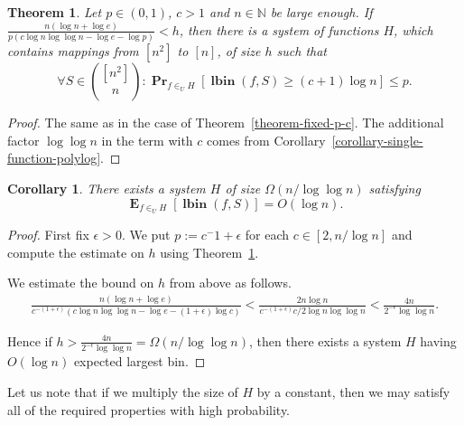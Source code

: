 \documentclass{article}
\newcommand{\lbin}[2]{\operatorname{\mathbf{lbin}}({#1}, {#2})}
\newcommand{\probs}[2]{\operatorname{\mathbf{Pr}}_{{#1}}\left[{#2}\right]}
\newcommand{\expects}[2]{\operatorname{\mathbf{E}}_{{#1}}\left[{#2}\right]}
\newtheorem{theorem}{Theorem}
\newtheorem{corollary}{Corollary}
\begin{document}
\begin{theorem}
\label{theorem-fixed-p-c-polylog}
Let $p \in (0, 1)$, $c > 1$ and $n \in \mathbb{N}$ be large enough. If $\frac{n(\log n + \log e)}{p(c \log n \log \log n - \log e - \log{p})} < h$, then there is a system of functions $H$, which contains mappings from $[n^2]$ to $[n]$, of size $h$ such that 
\[
\forall S \in \binom{[n^2]}{n} \colon \probs{f \in_U H}{\lbin{f}{S} \geq (c + 1) \log n} \leq p.
\]
\end{theorem}
\begin{proof}
The same as in the case of Theorem~\ref{theorem-fixed-p-c}. The additional factor $\log \log n$ in the term with $c$ comes from Corollary~\ref{corollary-single-function-polylog}.
\end{proof}

\begin{corollary}
There exists a system $H$ of size $\Omega(n/\log \log n)$ satisfying \[\expects{f \in_U H}{\lbin{f}{S}} = O(\log n).\]
\end{corollary}
\begin{proof}
First fix $\epsilon > 0$. We put $p:=c^-{1+\epsilon}$ for each $c \in [2, n/\log n]$ and compute the estimate on $h$ using Theorem~\ref{theorem-fixed-p-c-polylog}.

We estimate the bound on $h$ from above as follows.
\begin{align*}
    \frac{n(\log n + \log e)}{c^{-(1 + \epsilon)}(c \log n \log \log n - \log e - (1 + \epsilon) \log c)} < \frac{2n\log n}{c^{-(1+\epsilon)}c/2\log n \log \log n} < \frac{4n}{2^{-\epsilon}\log \log n}.
\end{align*}

Hence if $h > \frac{4n}{2^{-\epsilon}\log \log n} = \Omega(n/\log \log n)$, then there exists a system $H$ having $O(\log n)$ expected largest bin.
\end{proof}

Let us note that if we multiply the size of $H$ by a constant, then we may satisfy all of the required properties with high probability.
\end{document}
